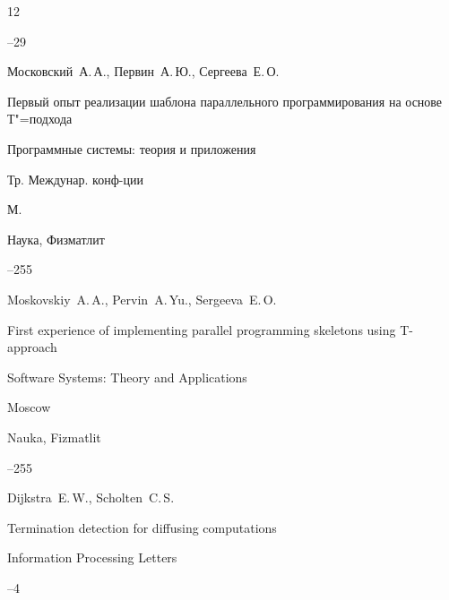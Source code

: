 \begin{thebibliography}{12}


--29




\by Московский~А.\,А., Первин~А.\,Ю., Сергеева~Е.\,О.

\paper Первый опыт реализации шаблона параллельного программирования на основе Т"=подхода 

\inbook Программные системы: теория и приложения

\bookinfo Тр. Междунар. конф-ции

\publaddr М.

\publ Наука, Физматлит



--255

\misctransl

\by Moskovskiy~A.\,A., Pervin~A.\,Yu., Sergeeva~E.\,O.

\paper First experience of implementing parallel programming skeletons using T-approach

\inbook Software Systems: Theory and Applications

\publaddr Moscow

\publ Nauka, Fizmatlit



--255






\by Dijkstra~E.\,W., Scholten~C.\,S.

\paper Termination detection for diffusing computations 

\jour Infor\-ma\-tion Processing Letters




--4






\end{thebibliography}



\noindent

\hskip6.5cm \thedate \par\noindent

\hskip6.5cm\therevdate















\makeengtitle







\renewcommand{\baselinestretch}{0.9}



\newpage



%

